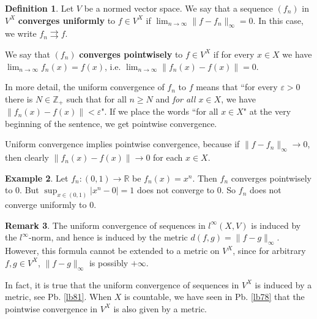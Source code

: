 \documentclass[12pt,b5paper,notitlepage]{article}
\theoremstyle{definition}
\newtheorem{df}{Definition}[section]
\newtheorem{eg}[df]{Example}
\newtheorem{rem}[df]{Remark}
\theoremstyle{plain}
\newcommand{\Zbb}{\mathbb Z}
\newcommand{\Rbb}{\mathbb R}
\newcommand{\eps}{\varepsilon}
\numberwithin{equation}{section}
\begin{document}
\begin{df}
Let $V$ be a normed vector space. We say that a sequence $(f_n)$ in $V^X$ \textbf{converges uniformly}  to $f\in V^X$ if $\lim_{n\rightarrow\infty}\lVert f-f_n\lVert_\infty=0$. In this case, we write ${f_n}\rightrightarrows f$. 

We say that $(f_n)$ \textbf{converges pointwisely}  to $f\in V^X$ if for every $x\in X$ we have $\lim_{n\rightarrow\infty} f_n(x)=f(x)$, i.e. $\lim_{n\rightarrow\infty} \lVert f_n(x)-f(x)\lVert=0$. \hfill\qedsymbol
\end{df}


In more detail, the uniform convergence of $f_n$ to $f$ means that ``for every $\eps>0$ there is $N\in\Zbb_+$ such that for all $n\geq N$ and  \emph{for all $x\in X$}, we have $\lVert f_n(x)-f(x)\lVert<\eps$". If we place the words ``for all $x\in X$" at the very beginning of the sentence, we get pointwise convergence.


Uniform convergence implies pointwise convergence, because if $\lVert f-f_n\lVert_\infty\rightarrow 0$, then clearly $\lVert f_n(x)-f(x)\lVert\rightarrow 0$ for each $x\in X$. 



\begin{eg}
Let $f_n:(0,1)\rightarrow\Rbb$ be $f_n(x)=x^n$. Then $f_n$ converges pointwisely to $0$. But $\sup_{x\in(0,1)}|x^n-0|=1$ does not converge to $0$. So $f_n$ does not converge uniformly to $0$.
\end{eg}



\begin{rem}
The uniform convergence of sequences in $l^\infty(X,V)$ is induced by the $l^\infty$-norm, and hence is induced by the metric $d(f,g)=\lVert f-g\lVert_\infty$. However, this formula cannot be extended to a metric on $V^X$, since for arbitrary $f,g\in V^X$, $\lVert f-g\lVert_\infty$ is possibly $+\infty$. 



In fact, it is true that the uniform convergence of sequences in $V^X$ is induced by a metric, see Pb. \ref{lb81}. When $X$ is countable, we have seen in Pb. \ref{lb78} that the pointwise convergence in $V^X$ is also given by a metric. \hfill\qedsymbol
\end{rem}
\end{document}
